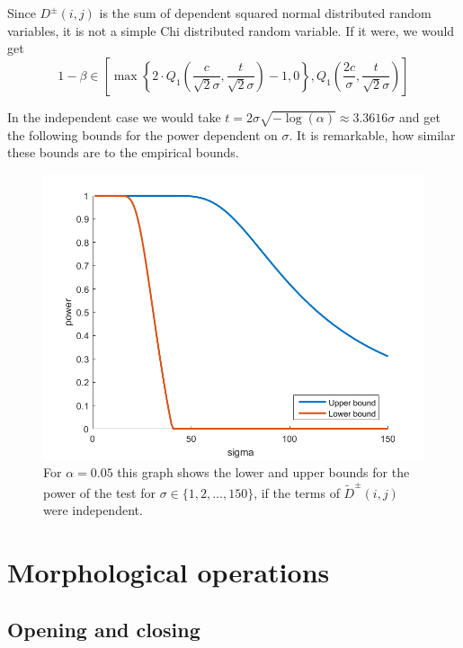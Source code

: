 \documentclass{beamer}
\begin{document}
\begin{frame}
	Since $D^\pm(i, j)$ is the sum of dependent squared normal distributed random variables, it is not a simple Chi distributed random variable. If it were, we would get
	\begin{equation*}
		1 - \beta \in \left[ \max \left\{ 2 \cdot Q_1 \left( \frac{c}{\sqrt{2} \sigma}, \frac{t}{\sqrt{2} \sigma} \right) - 1, 0 \right\}, Q_1 \left( \frac{2 c}{\sigma}, \frac{t}{\sqrt{2} \sigma} \right) \right]
	\end{equation*}
\end{frame}

\begin{frame}
	In the independent case we would take $t = 2 \sigma \sqrt{- \log(\alpha)} \approx 3.3616 \sigma$ and get the following bounds for the power dependent on $\sigma$. It is remarkable, how similar these bounds are to the empirical bounds.
	
	\begin{figure}[h]
		\includegraphics[width=0.6\linewidth]{Testing/TheoreticalPower}
		\caption[Theoretical power bounds]{For $\alpha = 0.05$ this graph shows the lower and upper bounds for the power of the test for $\sigma \in \{ 1, 2, \dots, 150 \}$, if the terms of $\tilde{D}^\pm(i, j)$ were independent.}
		\label{fig:TheoreticalPowerBounds}
	\end{figure}
\end{frame}

\section{Morphological operations}

\subsection{Opening and closing}
\end{document}
